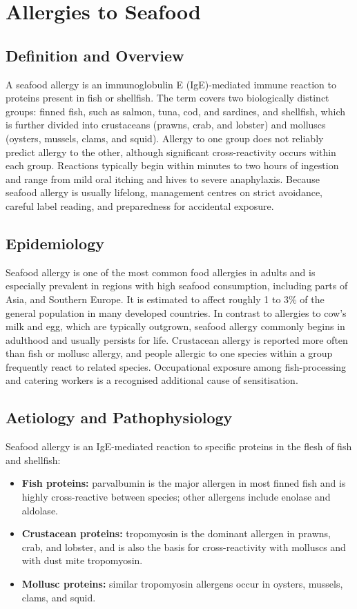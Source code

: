 \chapter{Allergies to Seafood}

\section*{Definition and Overview}
A seafood allergy is an immunoglobulin E (IgE)-mediated immune reaction to proteins present in fish or shellfish. The term covers two biologically distinct groups: finned fish, such as salmon, tuna, cod, and sardines, and shellfish, which is further divided into crustaceans (prawns, crab, and lobster) and molluscs (oysters, mussels, clams, and squid). Allergy to one group does not reliably predict allergy to the other, although significant cross-reactivity occurs within each group. Reactions typically begin within minutes to two hours of ingestion and range from mild oral itching and hives to severe anaphylaxis. Because seafood allergy is usually lifelong, management centres on strict avoidance, careful label reading, and preparedness for accidental exposure.

\section*{Epidemiology}
Seafood allergy is one of the most common food allergies in adults and is especially prevalent in regions with high seafood consumption, including parts of Asia, and Southern Europe. It is estimated to affect roughly 1 to 3\% of the general population in many developed countries. In contrast to allergies to cow's milk and egg, which are typically outgrown, seafood allergy commonly begins in adulthood and usually persists for life. Crustacean allergy is reported more often than fish or mollusc allergy, and people allergic to one species within a group frequently react to related species. Occupational exposure among fish-processing and catering workers is a recognised additional cause of sensitisation.

\section*{Aetiology and Pathophysiology}
Seafood allergy is an IgE-mediated reaction to specific proteins in the flesh of fish and shellfish:

\begin{itemize}
    \item \textbf{Fish proteins:} parvalbumin is the major allergen in most finned fish and is highly cross-reactive between species; other allergens include enolase and aldolase.
    \item \textbf{Crustacean proteins:} tropomyosin is the dominant allergen in prawns, crab, and lobster, and is also the basis for cross-reactivity with molluscs and with dust mite tropomyosin.
    \item \textbf{Mollusc proteins:} similar tropomyosin allergens occur in oysters, mussels, clams, and squid.
\end{itemize}

